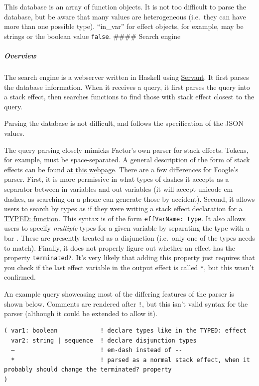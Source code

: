 \documentclass[
]{article}
\begin{document}
This database is an array of function objects. It is not too difficult
to parse the database, but be aware that many values are heterogeneous
(i.e.~they can have more than one possible type). ``in\_var'' for effect
objects, for example, may be strings or the boolean value
\texttt{false}. \#\#\#\# Search engine

\hypertarget{overview}{%
\subparagraph{Overview}\label{overview}}

The search engine is a webserver written in Haskell using
\href{https://www.servant.dev/}{Servant}. It first parses the database
information. When it receives a query, it first parses the query into a
stack effect, then searches functions to find those with stack effect
closest to the query.

Parsing the database is not difficult, and follows the specification of
the JSON values.

The query parsing closely mimicks Factor's own parser for stack effects.
Tokens, for example, must be space-separated. A general description of
the form of stack effects can be found
\href{https://docs.factorcode.org/content/article-effects.html}{at this
webpage}. There are a few differences for Foogle's parser. First, it is
more permissive in what types of dashes it accepts as a separator
between in variables and out variables (it will accept unicode em
dashes, as searching on a phone can generate those by accident). Second,
it allows users to search by types as if they were writing a stack
effect declaration for a
\href{https://docs.factorcode.org/content/word-TYPED__colon__,typed.html}{TYPED:
function}. This syntax is of the form \texttt{effVarName:\ type}. It
also allows users to specify \emph{multiple} types for a given variable
by separating the type with a bar \texttt{\textbar{}}. These are
presently treated as a disjunction (i.e.~only one of the types needs to
match). Finally, it does not properly figure out whether an effect has
the property \texttt{terminated?}. It's very likely that adding this
property just requires that you check if the last effect variable in the
output effect is called \texttt{*}, but this wasn't confirmed.

An example query showcasing most of the differing features of the parser
is shown below. Comments are rendered after \texttt{!}, but this isn't
valid syntax for the parser (although it could be extended to allow it).

\begin{verbatim}
( var1: boolean            ! declare types like in the TYPED: effect
  var2: string | sequence  ! declare disjunction types
  —                        ! em-dash instead of --
  *                        ! parsed as a normal stack effect, when it probably should change the terminated? property
)
\end{verbatim}
\end{document}
